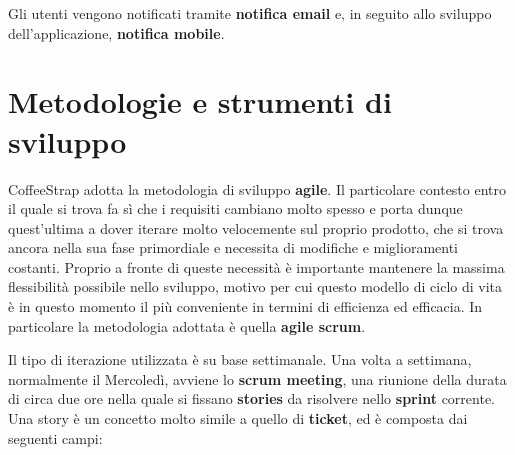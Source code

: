 Gli utenti vengono notificati tramite \textbf{notifica email} e, in seguito allo sviluppo dell'applicazione, \textbf{notifica mobile}.

\section{Metodologie e strumenti di sviluppo}

CoffeeStrap adotta la metodologia di sviluppo \textbf{\gls{agile}}. Il particolare contesto entro il quale si trova fa sì che i requisiti cambiano molto spesso e porta dunque quest'ultima a dover iterare molto velocemente sul proprio prodotto, che si trova ancora nella sua fase primordiale e necessita di modifiche e miglioramenti costanti. Proprio a fronte di queste necessità è importante mantenere la massima flessibilità possibile nello sviluppo, motivo per cui questo modello di ciclo di vita è in questo momento il più conveniente in termini di efficienza ed efficacia. In particolare la metodologia adottata è quella \textbf{agile \gls{scrum}}.

Il tipo di iterazione utilizzata è su base settimanale. Una volta a settimana, normalmente il Mercoledì, avviene lo \textbf{scrum meeting}, una riunione della durata di circa due ore nella quale si fissano \textbf{stories} da risolvere nello \textbf{\gls{sprint}} corrente. Una story è un concetto molto simile a quello di \textbf{ticket}, ed è composta dai seguenti campi:

